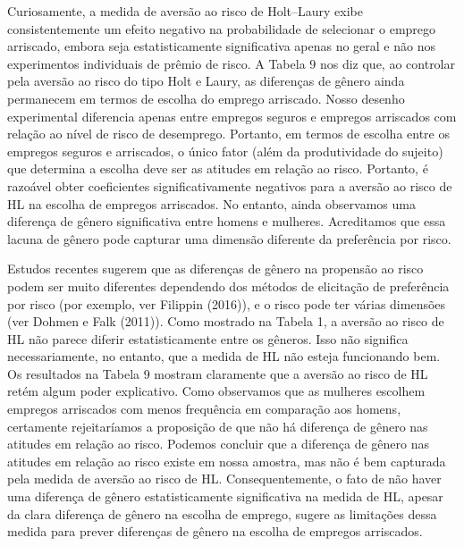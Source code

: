 \documentclass[a4paper,12pt]{article}[abntex2]
\begin{document}
Curiosamente, a medida de aversão ao risco de Holt–Laury exibe consistentemente um efeito negativo na probabilidade de selecionar o emprego arriscado, embora seja estatisticamente significativa apenas no geral e não nos experimentos individuais de prêmio de risco. A Tabela 9 nos diz que, ao controlar pela aversão ao risco do tipo Holt e Laury, as diferenças de gênero ainda permanecem em termos de escolha do emprego arriscado. Nosso desenho experimental diferencia apenas entre empregos seguros e empregos arriscados com relação ao nível de risco de desemprego. Portanto, em termos de escolha entre os empregos seguros e arriscados, o único fator (além da produtividade do sujeito) que determina a escolha deve ser as atitudes em relação ao risco. Portanto, é razoável obter coeficientes significativamente negativos para a aversão ao risco de HL na escolha de empregos arriscados. No entanto, ainda observamos uma diferença de gênero significativa entre homens e mulheres. Acreditamos que essa lacuna de gênero pode capturar uma dimensão diferente da preferência por risco.

Estudos recentes sugerem que as diferenças de gênero na propensão ao risco podem ser muito diferentes dependendo dos métodos de elicitação de preferência por risco (por exemplo, ver Filippin (2016)), e o risco pode ter várias dimensões (ver Dohmen e Falk (2011)). Como mostrado na Tabela 1, a aversão ao risco de HL não parece diferir estatisticamente entre os gêneros. Isso não significa necessariamente, no entanto, que a medida de HL não esteja funcionando bem. Os resultados na Tabela 9 mostram claramente que a aversão ao risco de HL retém algum poder explicativo. Como observamos que as mulheres escolhem empregos arriscados com menos frequência em comparação aos homens, certamente rejeitaríamos a proposição de que não há diferença de gênero nas atitudes em relação ao risco. Podemos concluir que a diferença de gênero nas atitudes em relação ao risco existe em nossa amostra, mas não é bem capturada pela medida de aversão ao risco de HL. Consequentemente, o fato de não haver uma diferença de gênero estatisticamente significativa na medida de HL, apesar da clara diferença de gênero na escolha de emprego, sugere as limitações dessa medida para prever diferenças de gênero na escolha de empregos arriscados.
\end{document}
